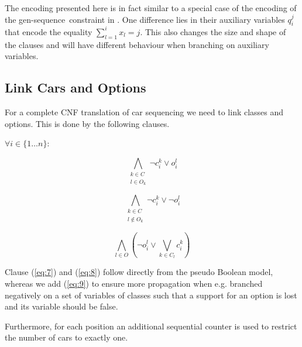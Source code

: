 \documentclass[]{easychair}
\newtheorem{proposition}[theorem]{Proposition}
\def\constraint#1{\mbox{{\rm\sc #1} }}
\def\gseq{{\constraint{gen-sequence}}}
\begin{document}
The encoding presented here is in fact similar to a special case of the encoding of the \gseq constraint in
\cite{Bacchus07}. One difference lies in their auxiliary variables $q_i^j$ that encode the equality $\sum_{l=1}^i x_l =
j$.  This also changes the size and shape of the clauses and will have different behaviour when branching on auxiliary
variables. 

\subsection{Link Cars and Options}
\label{sub:link}

For a complete CNF translation of car sequencing we need to link classes and options. This is done by the following
clauses. 

$\forall i\in \{1\ldots n\}$: 

\begin{equation} \label{eq:7}
     \bigwedge_{\substack{k \in C \\ l \in O_k }} \neg c^k_{i} \vee o^l_{i}
\end{equation}

\begin{equation} \label{eq:8}
    \bigwedge_{\substack{k \in C \\ l \not \in O_k}} \neg c^k_{i} \vee \neg o^l_{i}
\end{equation}

\begin{equation} \label{eq:9}
    \bigwedge_{l\in O} \left(\neg o^l_{i} \vee \bigvee_{k \in C_l} c^k_{i}\right)
\end{equation}

Clause (\ref{eq:7}) and (\ref{eq:8}) follow directly from the pseudo Boolean model, whereas we add (\ref{eq:9}) to
ensure more propagation when e.g. branched negatively on a set of variables of classes such that a support for an
option is lost and its variable should be false.

Furthermore, for each position an additional sequential counter is used to restrict the number of cars to exactly one. 

%
\end{document}
